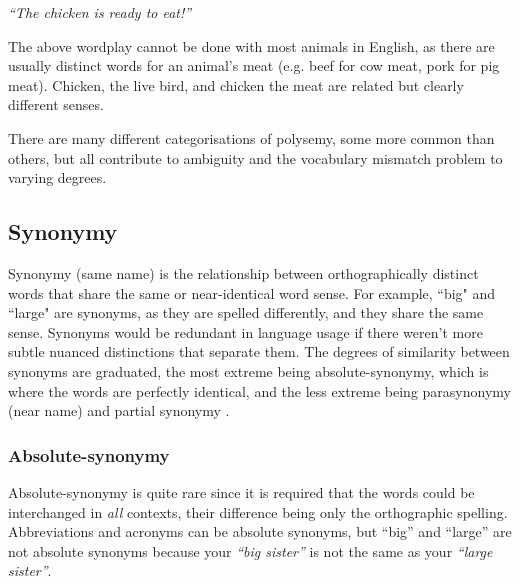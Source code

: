 \begin{center}
	\textit{``The chicken is ready to eat!''}
\end{center}

The above wordplay cannot be done with most animals in English, as there are usually distinct words for an animal's meat (e.g. beef for cow meat, pork for pig meat). Chicken, the live bird, and chicken the meat are related but clearly different senses. 

There are many different categorisations of polysemy, some more common than others, but all contribute to ambiguity and the vocabulary mismatch problem to varying degrees.


\subsection{Synonymy}
% 
Synonymy (same name) is the relationship between orthographically distinct words that share the same or near-identical word sense. For example, ``big" and ``large" are synonyms, as they are spelled differently, and they share the same sense. Synonyms would be redundant in language usage if there weren't more subtle nuanced distinctions that separate them. The degrees of similarity between synonyms are graduated, the most extreme being absolute-synonymy, which is where the words are perfectly identical, and the less extreme being parasynonymy (near name) and partial synonymy \cite{cruse1986lexical}.

\subsubsection{Absolute-synonymy}
Absolute-synonymy is quite rare since it is required that the words could be interchanged in \textit{all} contexts, their difference being only the orthographic spelling. Abbreviations and acronyms can be absolute synonyms, but ``big'' and ``large'' are not absolute synonyms because your \textit{``big sister''} is not the same as your \textit{``large sister''}.



